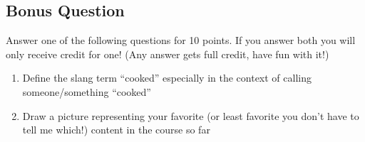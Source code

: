 \documentclass[12pt,addpoints]{exam}
\begin{document}
\begin{questions}
        \newpage
        \section*{Bonus Question}
        \question[10] Answer one of the following questions for 10 points. If you answer both you will
        only receive credit for one! (Any answer gets full credit, have fun with it!)
        \begin{enumerate}
            \item Define the slang term ``cooked'' especially in the context of calling someone/something ``cooked''
            \item Draw a picture representing your favorite (or least favorite you don't have to tell me which!) content
                in the course so far
        \end{enumerate}
    \end{questions}
\end{document}
